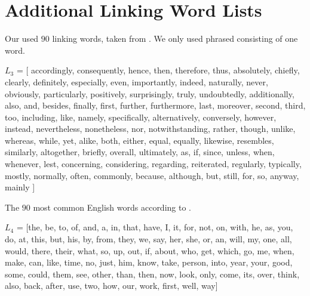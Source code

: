 \section{Additional Linking Word Lists}

Our used $90$ linking words, taken from \cite{linking}. We only used phrased consisting of one word.

$L_3$ = [
		accordingly,
        consequently,
        hence,
        then,
        therefore,
        thus,
        absolutely,
        chiefly,
        clearly,
        definitely,
        especially,
        even,
        importantly,
        indeed,
        naturally,
        never,
        obviously,
        particularly,
        positively,
        surprisingly,
        truly,
        undoubtedly,
        additionally,
        also,
        and,
        besides,
        finally,
        first,
        further,
        furthermore,
        last,
        moreover,
        second,
        third,
        too,
        including,
        like,
        namely,
        specifically,
        alternatively,
        conversely,
        however,
        instead,
        nevertheless,
        nonetheless,
        nor,
        notwithstanding,
        rather,
        though,
        unlike,
        whereas,
        while,
        yet,
        alike,
        both,
        either,
        equal,
        equally,
        likewise,
        resembles,
        similarly,
        altogether,
        briefly,
        overall,
        ultimately,
        as,
        if,
        since,
        unless,
        when,
        whenever,
        lest,
        concerning,
        considering,
        regarding,
        reiterated,
        regularly,
        typically,
        mostly,
        normally,
        often,
        commonly,
        because,
        although,
        but,
        still,
        for,
        so,
        anyway,
        mainly
]

The $90$ most common English words according to \cite{mostcommon}.

$L_4$ = [the,
        be,
        to,
        of,
        and,
        a,
        in,
        that,
        have,
        I,
        it,
        for,
        not,
        on,
        with,
        he,
        as,
        you,
        do,
        at,
        this,
        but,
        his,
        by,
        from,
        they,
        we,
        say,
        her,
        she,
        or,
        an,
        will,
        my,
        one,
        all,
        would,
        there,
        their,
        what,
        so,
        up,
        out,
        if,
        about,
        who,
        get,
        which,
        go,
        me,
        when,
        make,
        can,
        like,
        time,
        no,
        just,
        him,
        know,
        take,
        person,
        into,
        year,
        your,
        good,
        some,
        could,
        them,
        see,
        other,
        than,
        then,
        now,
        look,
        only,
        come,
        its,
        over,
        think,
        also,
        back,
        after,
        use,
        two,
        how,
        our,
        work,
        first,
        well,
        way]

